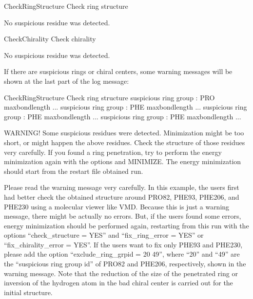 \documentclass[a4paper,11pt,oneside,english]{sphinxmanual}
\begin{document}
\begin{sphinxVerbatim}[commandchars=\\\{\}]
Check\PYGZus{}Ring\PYGZus{}Structure\PYGZgt{} Check ring structure

  No suspicious residue was detected.

Check\PYGZus{}Chirality\PYGZgt{} Check chirality

  No suspicious residue was detected.
\end{sphinxVerbatim}

If there are suspicious rings or chiral centers, some warning messages will be shown at the last part of the log message:

\begin{sphinxVerbatim}[commandchars=\\\{\}]
Check\PYGZus{}Ring\PYGZus{}Structure\PYGZgt{} Check ring structure
  suspicious ring group    : PRO      max\PYGZus{}bond\PYGZus{}length ...
  suspicious ring group    : PHE      max\PYGZus{}bond\PYGZus{}length ...
  suspicious ring group    : PHE     max\PYGZus{}bond\PYGZus{}length ...
  suspicious ring group    : PHE     max\PYGZus{}bond\PYGZus{}length ...

  WARNING!
  Some suspicious residues were detected. Minimization might be too short,
  or  might happen  the above residues.
  Check the structure of those residues very carefully. If you found a ring
  penetration, try to perform the energy minimization again with the
  options  and   \PYG{o}{[}MINIMIZE\PYG{o}{]}.
  The energy minimization should start from the restart file obtained
    run.
\end{sphinxVerbatim}

Please read the warning message very carefully.
In this example, the users first had better check the obtained structure around PRO82, PHE93, PHE206, and PHE230 using a molecular viewer like VMD.
Because this is just a warning message, there might be actually no errors.
But, if the users found some errors, energy minimization should be performed again, restarting from this run
with the options “check\_structure = YES” and “fix\_ring\_error = YES” or “fix\_chirality\_error = YES”.
If the users want to fix only PHE93 and PHE230, please add the option “exclude\_ring\_grpid = 20 49”,
where “20” and “49” are the “suspicious ring group id” of PRO82 and PHE206, respectively, shown in the warning message.
Note that the reduction of the size of the penetrated ring or inversion of the hydrogen atom in the bad chiral center is carried out for the initial structure.
\end{document}
